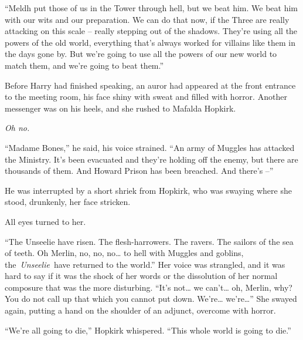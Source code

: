 ``Meldh put those of us in the Tower through hell, but we beat him. We
beat him with our wits and our preparation. We can do that now, if the
Three are really attacking on this scale -- really stepping out of the
shadows. They're using all the powers of the old world, everything
that's always worked for villains like them in the days gone by. But
we're going to use all the powers of our new world to match them, and
we're going to beat them.''

Before Harry had finished speaking, an auror had appeared at the front
entrance to the meeting room, his face shiny with sweat and filled with
horror. Another messenger was on his heels, and she rushed to Mafalda
Hopkirk.

\emph{Oh no.}

``Madame Bones,'' he said, his voice strained. ``An army of Muggles has
attacked the Ministry. It's been evacuated and they're holding off the
enemy, but there are thousands of them. And Howard Prison has been
breached. And there's --''

He was interrupted by a short shriek from Hopkirk, who was swaying where
she stood, drunkenly, her face stricken.

All eyes turned to her.

``The Unseelie have risen. The flesh-harrowers. The ravers. The sailors
of the sea of teeth. Oh Merlin, no, no, no\ldots{} to hell with Muggles
and goblins, the~\emph{Unseelie}~have returned to the world.'' Her voice
was strangled, and it was hard to say if it was the shock of her words
or the dissolution of her normal composure that was the more disturbing.
``It's not\ldots{} we can't\ldots{} oh, Merlin, why? You do not call up
that which you cannot put down. We're\ldots{} we're\ldots{}'' She swayed
again, putting a hand on the shoulder of an adjunct, overcome with
horror.

``We're all going to die,'' Hopkirk whispered. ``This whole world is
going to die.''

